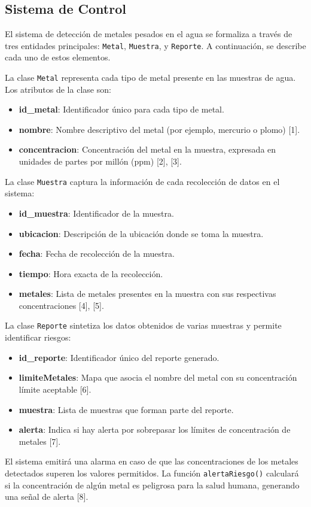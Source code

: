 \newpage

\subsection{Sistema de Control}
El sistema de detección de metales pesados en el agua se formaliza a través de tres entidades principales: \texttt{Metal}, \texttt{Muestra}, y \texttt{Reporte}. A continuación, se describe cada uno de estos elementos.

La clase \texttt{Metal} representa cada tipo de metal presente en las muestras de agua. Los atributos de la clase son:
\begin{itemize}
    \item \textbf{id\_metal}: Identificador único para cada tipo de metal.
    \item \textbf{nombre}: Nombre descriptivo del metal (por ejemplo, mercurio o plomo) [1].
    \item \textbf{concentracion}: Concentración del metal en la muestra, expresada en unidades de partes por millón (ppm) [2], [3].
\end{itemize}

La clase \texttt{Muestra} captura la información de cada recolección de datos en el sistema:
\begin{itemize}
    \item \textbf{id\_muestra}: Identificador de la muestra.
    \item \textbf{ubicacion}: Descripción de la ubicación donde se toma la muestra.
    \item \textbf{fecha}: Fecha de recolección de la muestra.
    \item \textbf{tiempo}: Hora exacta de la recolección.
    \item \textbf{metales}: Lista de metales presentes en la muestra con sus respectivas concentraciones [4], [5].
\end{itemize}

La clase \texttt{Reporte} sintetiza los datos obtenidos de varias muestras y permite identificar riesgos:
\begin{itemize}
    \item \textbf{id\_reporte}: Identificador único del reporte generado.
    \item \textbf{limiteMetales}: Mapa que asocia el nombre del metal con su concentración límite aceptable [6].
    \item \textbf{muestra}: Lista de muestras que forman parte del reporte.
    \item \textbf{alerta}: Indica si hay alerta por sobrepasar los límites de concentración de metales [7].
\end{itemize}

El sistema emitirá una alarma en caso de que las concentraciones de los metales detectados superen los valores permitidos. La función \texttt{alertaRiesgo()} calculará si la concentración de algún metal es peligrosa para la salud humana, generando una señal de alerta [8].
